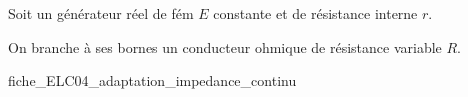 


\hauteurLargeurCadreReponse		{8mm}{4cm}
\typeEntrainement				{} %
\initialisationEntrainement


                                \initialisationPartieGauche %

Soit un générateur réel de fém $E$ constante et de résistance interne $r$. 

On branche à ses bornes un conducteur ohmique de résistance variable $R$.


                                \initialisationPartieDroite %
\begin{center}
{fiche_ELC04_adaptation_impedance_continu}
\end{center}
                               \finalisationDuPartageDePage %


